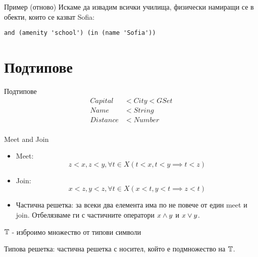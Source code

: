 \documentclass[9pt]{beamer}
\begin{document}
  \begin{frame}[fragile]{Пример (отново)}
    Искаме да извадим всички училища, физически намиращи се в обекти,
    които се казват Sofia:
    \begin{lstwrap}\begin{lstlisting}
and (amenity 'school') (in (name 'Sofia'))
    \end{lstlisting}\end{lstwrap}
  \end{frame}


  \section{Подтипове}
  \begin{frame}{Подтипове}
    \begin{align*}
        Capital & \less City \less GSet \\
        Name & \less String \\
        Distance & \less Number \\
    \end{align*}
  \end{frame}

  \begin{frame}{Meet and Join}
    \begin{itemize}
      \item Meet:
      \begin{equation}
          z \less x, z \less y,
              \forall t \in X (t \less x, t \less y \implies t \less z)
      \end{equation}

      \item Join:
      \begin{equation}
          x \less z, y \less z,
              \forall t \in X (x \less t, y \less t \implies z \less t)
      \end{equation}

    \item Частична решетка: за всеки два елемента има по не повече от един
      meet и join. Отбелязваме ги с частичните оператори $x \wedge y$
      и $x \vee y$.
    \end{itemize}
  \end{frame}

  \begin{frame}
    $\mathbb{T}$ - изброимо множество от типови символи

    Типова решетка: частична решетка с носител, който е подмножество на $\mathbb{T}$.
  \end{frame}
\end{document}
